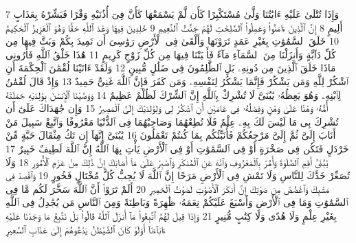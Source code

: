 {\tiny\colorbox{cl_aya}{7}} وَإِذَا تُتْلَىٰ عَلَيْهِ ءَايَٰتُنَا وَلَّىٰ مُسْتَكْبِرًا كَأَن لَّمْ يَسْمَعْهَا كَأَنَّ فِىٓ أُذُنَيْهِ وَقْرًا فَبَشِّرْهُ بِعَذَابٍ أَلِيمٍ
{\tiny\colorbox{cl_aya}{8}} إِنَّ ٱلَّذِينَ ءَامَنُوا۟ وَعَمِلُوا۟ ٱلصَّٰلِحَٰتِ لَهُمْ جَنَّٰتُ ٱلنَّعِيمِ
{\tiny\colorbox{cl_aya}{9}} خَٰلِدِينَ فِيهَا وَعْدَ ٱللَّهِ حَقًّا وَهُوَ ٱلْعَزِيزُ ٱلْحَكِيمُ
{\tiny\colorbox{cl_aya}{10}} خَلَقَ ٱلسَّمَٰوَٰتِ بِغَيْرِ عَمَدٍ تَرَوْنَهَا وَأَلْقَىٰ فِى ٱلْأَرْضِ رَوَٰسِىَ أَن تَمِيدَ بِكُمْ وَبَثَّ فِيهَا مِن كُلِّ دَآبَّةٍ وَأَنزَلْنَا مِنَ ٱلسَّمَآءِ مَآءً فَأَنۢبَتْنَا فِيهَا مِن كُلِّ زَوْجٍ كَرِيمٍ
{\tiny\colorbox{cl_aya}{11}} هَٰذَا خَلْقُ ٱللَّهِ فَأَرُونِى مَاذَا خَلَقَ ٱلَّذِينَ مِن دُونِهِۦ بَلِ ٱلظَّٰلِمُونَ فِى ضَلَٰلٍ مُّبِينٍ
{\tiny\colorbox{cl_aya}{12}} وَلَقَدْ ءَاتَيْنَا لُقْمَٰنَ ٱلْحِكْمَةَ أَنِ ٱشْكُرْ لِلَّهِ وَمَن يَشْكُرْ فَإِنَّمَا يَشْكُرُ لِنَفْسِهِۦ وَمَن كَفَرَ فَإِنَّ ٱللَّهَ غَنِىٌّ حَمِيدٌ
{\tiny\colorbox{cl_aya}{13}} وَإِذْ قَالَ لُقْمَٰنُ لِٱبْنِهِۦ وَهُوَ يَعِظُهُۥ يَٰبُنَىَّ لَا تُشْرِكْ بِٱللَّهِ إِنَّ ٱلشِّرْكَ لَظُلْمٌ عَظِيمٌ
{\tiny\colorbox{cl_aya}{14}} وَوَصَّيْنَا ٱلْإِنسَٰنَ بِوَٰلِدَيْهِ حَمَلَتْهُ أُمُّهُۥ وَهْنًا عَلَىٰ وَهْنٍ وَفِصَٰلُهُۥ فِى عَامَيْنِ أَنِ ٱشْكُرْ لِى وَلِوَٰلِدَيْكَ إِلَىَّ ٱلْمَصِيرُ
{\tiny\colorbox{cl_aya}{15}} وَإِن جَٰهَدَاكَ عَلَىٰٓ أَن تُشْرِكَ بِى مَا لَيْسَ لَكَ بِهِۦ عِلْمٌ فَلَا تُطِعْهُمَا وَصَاحِبْهُمَا فِى ٱلدُّنْيَا مَعْرُوفًا وَٱتَّبِعْ سَبِيلَ مَنْ أَنَابَ إِلَىَّ ثُمَّ إِلَىَّ مَرْجِعُكُمْ فَأُنَبِّئُكُم بِمَا كُنتُمْ تَعْمَلُونَ
{\tiny\colorbox{cl_aya}{16}} يَٰبُنَىَّ إِنَّهَآ إِن تَكُ مِثْقَالَ حَبَّةٍ مِّنْ خَرْدَلٍ فَتَكُن فِى صَخْرَةٍ أَوْ فِى ٱلسَّمَٰوَٰتِ أَوْ فِى ٱلْأَرْضِ يَأْتِ بِهَا ٱللَّهُ إِنَّ ٱللَّهَ لَطِيفٌ خَبِيرٌ
{\tiny\colorbox{cl_aya}{17}} يَٰبُنَىَّ أَقِمِ ٱلصَّلَوٰةَ وَأْمُرْ بِٱلْمَعْرُوفِ وَٱنْهَ عَنِ ٱلْمُنكَرِ وَٱصْبِرْ عَلَىٰ مَآ أَصَابَكَ إِنَّ ذَٰلِكَ مِنْ عَزْمِ ٱلْأُمُورِ
{\tiny\colorbox{cl_aya}{18}} وَلَا تُصَعِّرْ خَدَّكَ لِلنَّاسِ وَلَا تَمْشِ فِى ٱلْأَرْضِ مَرَحًا إِنَّ ٱللَّهَ لَا يُحِبُّ كُلَّ مُخْتَالٍ فَخُورٍ
{\tiny\colorbox{cl_aya}{19}} وَٱقْصِدْ فِى مَشْيِكَ وَٱغْضُضْ مِن صَوْتِكَ إِنَّ أَنكَرَ ٱلْأَصْوَٰتِ لَصَوْتُ ٱلْحَمِيرِ
{\tiny\colorbox{cl_aya}{20}} أَلَمْ تَرَوْا۟ أَنَّ ٱللَّهَ سَخَّرَ لَكُم مَّا فِى ٱلسَّمَٰوَٰتِ وَمَا فِى ٱلْأَرْضِ وَأَسْبَغَ عَلَيْكُمْ نِعَمَهُۥ ظَٰهِرَةً وَبَاطِنَةً وَمِنَ ٱلنَّاسِ مَن يُجَٰدِلُ فِى ٱللَّهِ بِغَيْرِ عِلْمٍ وَلَا هُدًى وَلَا كِتَٰبٍ مُّنِيرٍ
{\tiny\colorbox{cl_aya}{21}} وَإِذَا قِيلَ لَهُمُ ٱتَّبِعُوا۟ مَآ أَنزَلَ ٱللَّهُ قَالُوا۟ بَلْ نَتَّبِعُ مَا وَجَدْنَا عَلَيْهِ ءَابَآءَنَآ أَوَلَوْ كَانَ ٱلشَّيْطَٰنُ يَدْعُوهُمْ إِلَىٰ عَذَابِ ٱلسَّعِيرِ
